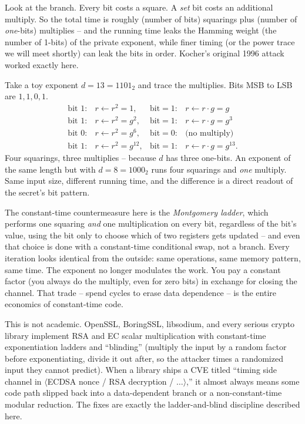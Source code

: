 Look at the branch. Every bit costs a square. A \emph{set} bit costs an additional multiply. So the total time is roughly (number of bits) squarings plus (number of \emph{one}-bits) multiplies -- and the running time leaks the Hamming weight (the number of 1-bits) of the private exponent, while finer timing (or the power trace we will meet shortly) can leak the bits in order. Kocher's original 1996 attack worked exactly here.

\begin{example}
\label{ch37:sqmul-example}
Take a toy exponent $d = 13 = 1101_2$ and trace the multiplies. Bits MSB to LSB are $1,1,0,1$.
\[
\begin{array}{llll}
\text{bit } 1: & r \leftarrow r^2 = 1, & \text{bit}=1: & r \leftarrow r\cdot g = g \\
\text{bit } 1: & r \leftarrow r^2 = g^2, & \text{bit}=1: & r \leftarrow r\cdot g = g^3 \\
\text{bit } 0: & r \leftarrow r^2 = g^6, & \text{bit}=0: & \text{(no multiply)} \\
\text{bit } 1: & r \leftarrow r^2 = g^{12}, & \text{bit}=1: & r \leftarrow r\cdot g = g^{13}.
\end{array}
\]
Four squarings, three multiplies -- because $d$ has three one-bits. An exponent of the same length but with $d = 8 = 1000_2$ runs four squarings and \emph{one} multiply. Same input size, different running time, and the difference is a direct readout of the secret's bit pattern.
\end{example}


\begin{whybox}
The constant-time countermeasure here is the \emph{Montgomery ladder}, which performs one squaring \emph{and} one multiplication on every bit, regardless of the bit's value, using the bit only to choose which of two registers gets updated -- and even that choice is done with a constant-time conditional swap, not a branch. Every iteration looks identical from the outside: same operations, same memory pattern, same time. The exponent no longer modulates the work. You pay a constant factor (you always do the multiply, even for zero bits) in exchange for closing the channel. That trade -- spend cycles to erase data dependence -- is the entire economics of constant-time code.
\end{whybox}

\begin{applicationbox}
This is not academic. OpenSSL, BoringSSL, libsodium, and every serious crypto library implement RSA and EC scalar multiplication with constant-time exponentiation ladders and ``blinding'' (multiply the input by a random factor before exponentiating, divide it out after, so the attacker times a randomized input they cannot predict). When a library ships a CVE titled ``timing side channel in $\langle$ECDSA nonce / RSA decryption / $\ldots\rangle$,'' it almost always means some code path slipped back into a data-dependent branch or a non-constant-time modular reduction. The fixes are exactly the ladder-and-blind discipline described here.
\end{applicationbox}

